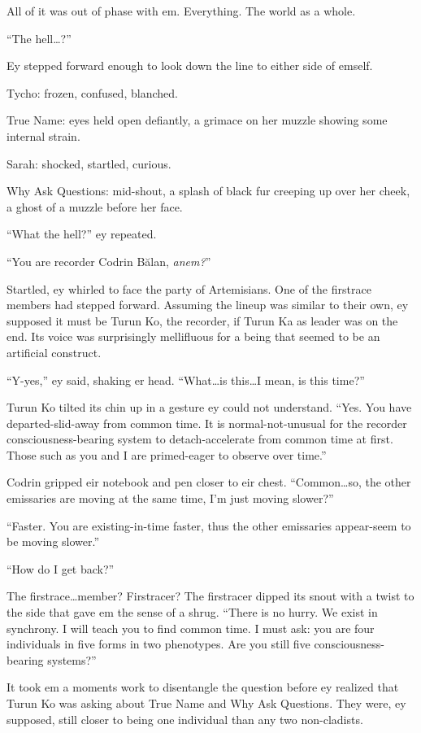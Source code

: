 All of it was out of phase with em. Everything. The world as a whole.

``The hell\ldots?''

Ey stepped forward enough to look down the line to either side of emself.

Tycho: frozen, confused, blanched.

True Name: eyes held open defiantly, a grimace on her muzzle showing some internal strain.

Sarah: shocked, startled, curious.

Why Ask Questions: mid-shout, a splash of black fur creeping up over her cheek, a ghost of a muzzle before her face.

``What the hell?'' ey repeated.

``You are recorder Codrin Bălan, \emph{anem?}''

Startled, ey whirled to face the party of Artemisians. One of the firstrace members had stepped forward. Assuming the lineup was similar to their own, ey supposed it must be Turun Ko, the recorder, if Turun Ka as leader was on the end. Its voice was surprisingly mellifluous for a being that seemed to be an artificial construct.

``Y-yes,'' ey said, shaking er head. ``What\ldots is this\ldots I mean, is this time?''

Turun Ko tilted its chin up in a gesture ey could not understand. ``Yes. You have departed-slid-away from common time. It is normal-not-unusual for the recorder consciousness-bearing system to detach-accelerate from common time at first. Those such as you and I are primed-eager to observe over time.''

Codrin gripped eir notebook and pen closer to eir chest. ``Common\ldots so, the other emissaries are moving at the same time, I'm just moving slower?''

``Faster. You are existing-in-time faster, thus the other emissaries appear-seem to be moving slower.''

``How do I get back?''

The firstrace\ldots member? Firstracer? The firstracer dipped its snout with a twist to the side that gave em the sense of a shrug. ``There is no hurry. We exist in synchrony. I will teach you to find common time. I must ask: you are four individuals in five forms in two phenotypes. Are you still five consciousness-bearing systems?''

It took em a moments work to disentangle the question before ey realized that Turun Ko was asking about True Name and Why Ask Questions. They were, ey supposed, still closer to being one individual than any two non-cladists.

